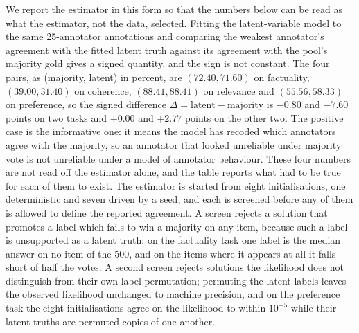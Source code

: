 \documentclass{article}
\begin{document}
We report the estimator in this form so that the numbers below can be read as what the estimator, not the data, selected. Fitting the latent-variable model to the same 25-annotator annotations and comparing the weakest annotator's agreement with the fitted latent truth against its agreement with the pool's majority gold gives a signed quantity, and the sign is not constant. The four pairs, as (majority, latent) in percent, are $(72.40, 71.60)$ on factuality, $(39.00, 31.40)$ on coherence, $(88.41, 88.41)$ on relevance and $(55.56, 58.33)$ on preference, so the signed difference $\Delta = \text{latent} - \text{majority}$ is $-0.80$ and $-7.60$ points on two tasks and $+0.00$ and $+2.77$ points on the other two. The positive case is the informative one: it means the model has recoded which annotators agree with the majority, so an annotator that looked unreliable under majority vote is not unreliable under a model of annotator behaviour. These four numbers are not read off the estimator alone, and the table reports what had to be true for each of them to exist. The estimator is started from eight initialisations, one deterministic and seven driven by a seed, and each is screened before any of them is allowed to define the reported agreement. A screen rejects a solution that promotes a label which fails to win a majority on any item, because such a label is unsupported as a latent truth: on the factuality task one label is the median answer on no item of the 500, and on the items where it appears at all it falls short of half the votes. A second screen rejects solutions the likelihood does not distinguish from their own label permutation; permuting the latent labels leaves the observed likelihood unchanged to machine precision, and on the preference task the eight initialisations agree on the likelihood to within $10^{-5}$ while their latent truths are permuted copies of one another. 
\end{document}
